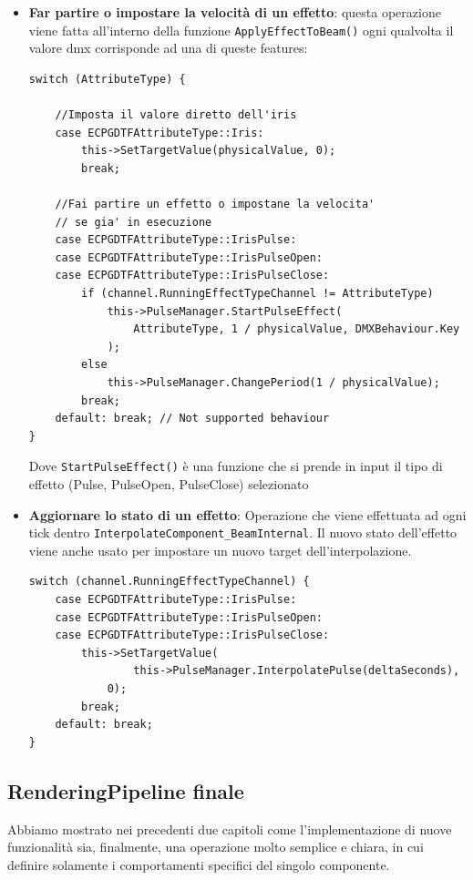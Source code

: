 \documentclass[main.tex]{subfiles}
\begin{document}
\begin{itemize}
    \item \textbf{Far partire o impostare la velocità di un effetto}: questa operazione viene fatta all'interno della funzione \lstinline{ApplyEffectToBeam()} ogni qualvolta il valore dmx corrisponde ad una di queste features:
    \begin{lstlisting}
switch (AttributeType) {

    //Imposta il valore diretto dell'iris
	case ECPGDTFAttributeType::Iris:
		this->SetTargetValue(physicalValue, 0);
		break;

    //Fai partire un effetto o impostane la velocita'
    // se gia' in esecuzione
	case ECPGDTFAttributeType::IrisPulse:
	case ECPGDTFAttributeType::IrisPulseOpen:
	case ECPGDTFAttributeType::IrisPulseClose:
		if (channel.RunningEffectTypeChannel != AttributeType) 
            this->PulseManager.StartPulseEffect(
                AttributeType, 1 / physicalValue, DMXBehaviour.Key
            );
		else
            this->PulseManager.ChangePeriod(1 / physicalValue);
		break;
    default: break; // Not supported behaviour
}
\end{lstlisting}
    Dove \lstinline{StartPulseEffect()} è una funzione che si prende in input il tipo di effetto (Pulse, PulseOpen, PulseClose) selezionato
    \item \textbf{Aggiornare lo stato di un effetto}: Operazione che viene effettuata ad ogni tick dentro \lstinline{InterpolateComponent_BeamInternal}. Il nuovo stato dell'effetto viene anche usato per impostare un nuovo target dell'interpolazione.
    \begin{lstlisting}
switch (channel.RunningEffectTypeChannel) {
    case ECPGDTFAttributeType::IrisPulse:
    case ECPGDTFAttributeType::IrisPulseOpen:
    case ECPGDTFAttributeType::IrisPulseClose:
        this->SetTargetValue(
                this->PulseManager.InterpolatePulse(deltaSeconds),
            0);
        break;
    default: break;
}
\end{lstlisting}
\end{itemize}

\subsection{RenderingPipeline finale}\label{subsec:5_final}
Abbiamo mostrato nei precedenti due capitoli come l'implementazione di nuove funzionalità sia, finalmente, una operazione molto semplice e chiara, in cui definire solamente i comportamenti specifici del singolo componente.
\end{document}
